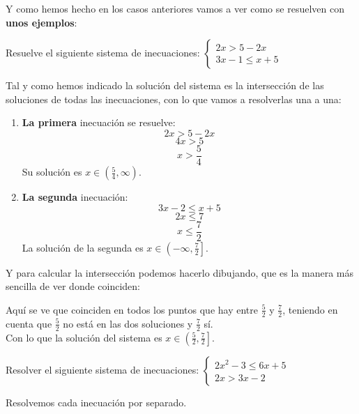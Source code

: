 \documentclass[a4paper,11pt,answers]{exam}
\begin{document}
Y como hemos hecho en los casos anteriores vamos a ver como se resuelven con
\textbf{unos ejemplos}:
\begin{questions}
\question Resuelve el siguiente sistema de inecuaciones:
  $
  \begin{cases}
    2x > 5 - 2x\\
    3x - 1 \leq x + 5
  \end{cases}$
  \begin{solution}
    Tal y como hemos indicado la solución del sistema es la intersección de las soluciones
    de todas las inecuaciones, con lo que vamos a resolverlas una a una:
    \begin{enumerate}
    \item \textbf{La primera} inecuación se resuelve:
      \[2x > 5 - 2x\]
      \[4x > 5\]
      \[x > \frac{5}{4}\]
      Su solución es $x \in \left(\frac{5}{4}, \infty\right)$.
    \item \textbf{La segunda} inecuación:
      \[3x - 2 \leq x + 5\]
      \[2x \leq 7\]
      \[x \leq \frac{7}{2}\]
      La solución de la segunda es $x \in \left(-\infty, \frac{7}{2}\right]$.
    \end{enumerate}
    Y para calcular la intersección podemos hacerlo dibujando, que es la manera más sencilla de
    ver donde coinciden:
    \begin{center}
    \end{center}
    Aquí se ve que coinciden en todos los puntos que hay entre $\frac{5}{2}$ y $\frac{7}{2}$,
    teniendo en cuenta que $\frac{5}{2}$ no está en las dos soluciones y $\frac{7}{2}$ sí.\\
    Con lo que la solución del sistema es $x \in \left(\frac{5}{2}, \frac{7}{2} \right]$.
  \end{solution}
\question Resolver el siguiente sistema de inecuaciones:
  $
  \begin{cases}
    2x^2 - 3 \leq 6x+5\\
    2x > 3x - 2
  \end{cases}
  $
  \begin{solution}
    Resolvemos cada inecuación por separado.\\


\end{solution}
\end{questions}
\end{document}
